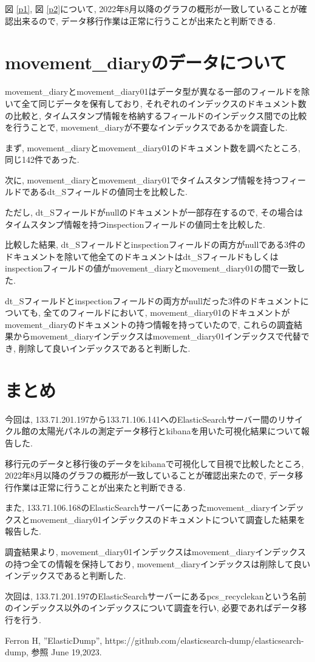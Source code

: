 \documentclass[a4j,12pt,]{jarticle}
\begin{document}
図 \ref{p1}, 図 \ref{p2}について, 2022年8月以降のグラフの概形が一致していることが確認出来るので, データ移行作業は正常に行うことが出来たと判断できる.

\section{movement\_diaryのデータについて}
movement\_diaryとmovement\_diary01はデータ型が異なる一部のフィールドを除いて全て同じデータを保有しており, それぞれのインデックスのドキュメント数の比較と, タイムスタンプ情報を格納するフィールドのインデックス間での比較を行うことで, movement\_diaryが不要なインデックスであるかを調査した.

まず, movement\_diaryとmovement\_diary01のドキュメント数を調べたところ, 同じ142件であった.

次に, movement\_diaryとmovement\_diary01でタイムスタンプ情報を持つフィールドであるdt\_Sフィールドの値同士を比較した.

ただし, dt\_Sフィールドがnullのドキュメントが一部存在するので, その場合はタイムスタンプ情報を持つinspectionフィールドの値同士を比較した.

比較した結果, dt\_Sフィールドとinspectionフィールドの両方がnullである3件のドキュメントを除いて他全てのドキュメントはdt\_Sフィールドもしくはinspectionフィールドの値がmovement\_diaryとmovement\_diary01の間で一致した.

dt\_Sフィールドとinspectionフィールドの両方がnullだった3件のドキュメントについても, 全てのフィールドにおいて, movement\_diary01のドキュメントがmovement\_diaryのドキュメントの持つ情報を持っていたので, これらの調査結果からmovement\_diaryインデックスはmovement\_diary01インデックスで代替でき, 削除して良いインデックスであると判断した.

\section{まとめ}
今回は, 133.71.201.197から133.71.106.141へのElasticSearchサーバー間のリサイクル館の太陽光パネルの測定データ移行とkibanaを用いた可視化結果について報告した.

移行元のデータと移行後のデータをkibanaで可視化して目視で比較したところ, 2022年8月以降のグラフの概形が一致していることが確認出来たので, データ移行作業は正常に行うことが出来たと判断できる.

また, 133.71.106.168のElasticSearchサーバーにあったmovement\_diaryインデックスとmovement\_diary01インデックスのドキュメントについて調査した結果を報告した.

調査結果より, movement\_diary01インデックスはmovement\_diaryインデックスの持つ全ての情報を保持しており, movement\_diaryインデックスは削除して良いインデックスであると判断した.

次回は, 133.71.201.197のElasticSearchサーバーにあるpcs\_recyclekanという名前のインデックス以外のインデックスについて調査を行い, 必要であればデータ移行を行う.

\begin{thebibliography}{5}
  Ferron H, ”ElasticDump”, https://github.com/elasticsearch-dump/elasticsearch-dump, 参照 June 19,2023.
\end{thebibliography}
\end{document}

